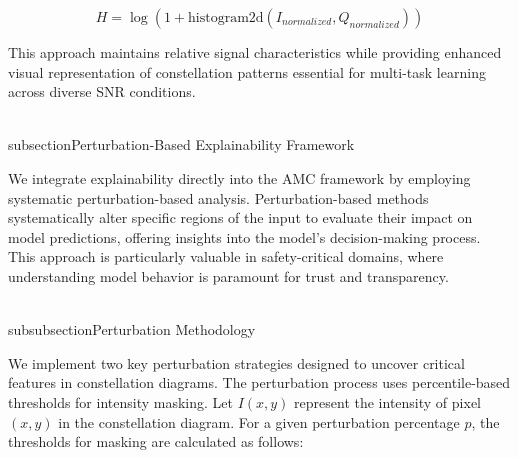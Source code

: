 \documentclass{ELSP}
\begin{document}
\begin{equation}
H = \log(1 + \text{histogram2d}(I_{normalized}, Q_{normalized}))
\end{equation}

This approach maintains relative signal characteristics while providing enhanced visual representation of constellation patterns essential for multi-task learning across diverse SNR conditions.

\\subsection{Perturbation-Based Explainability Framework}

We integrate explainability directly into the AMC framework by employing systematic perturbation-based analysis. Perturbation-based methods systematically alter specific regions of the input to evaluate their impact on model predictions, offering insights into the model's decision-making process. This approach is particularly valuable in safety-critical domains, where understanding model behavior is paramount for trust and transparency.

\\subsubsection{Perturbation Methodology}

We implement two key perturbation strategies designed to uncover critical features in constellation diagrams. The perturbation process uses percentile-based thresholds for intensity masking. Let $I(x,y)$ represent the intensity of pixel $(x,y)$ in the constellation diagram. For a given perturbation percentage $p$, the thresholds for masking are calculated as follows:
\end{document}
